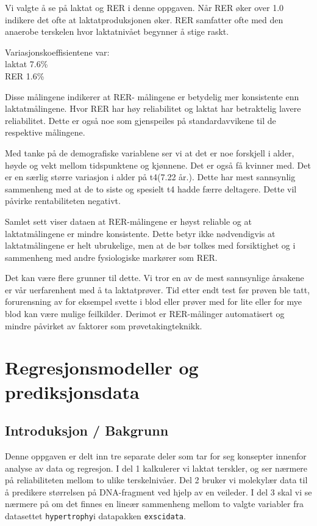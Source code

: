 \documentclass[
  letterpaper,
  DIV=11,
  numbers=noendperiod]{scrreprt}
\begin{document}
Vi valgte å se på laktat og RER i denne oppgaven. Når RER øker over 1.0
indikere det ofte at laktatproduksjonen øker. RER samfatter ofte med den
anaerobe terskelen hvor laktatnivået begynner å stige raskt.

Variasjonskoeffisientene var:\\
laktat 7.6\%\\
RER 1.6\%

Disse målingene indikerer at RER- målingene er betydelig mer konsistente
enn laktatmålingene. Hvor RER har høy reliabilitet og laktat har
betraktelig lavere reliabilitet. Dette er også noe som gjenspeiles på
standardavvikene til de respektive målingene.

Med tanke på de demografiske variablene ser vi at det er noe forskjell i
alder, høyde og vekt mellom tidspunktene og kjønnene. Det er også få
kvinner med. Det er en særlig større variasjon i alder på t4(7.22 år.).
Dette har mest sannsynlig sammenheng med at de to siste og spesielt t4
hadde færre deltagere. Dette vil påvirke rentabiliteten negativt.

Samlet sett viser dataen at RER-målingene er høyst reliable og at
laktatmålingene er mindre konsistente. Dette betyr ikke nødvendigvis at
laktatmålingene er helt ubrukelige, men at de bør tolkes med
forsiktighet og i sammenheng med andre fysiologiske markører som RER.

Det kan være flere grunner til dette. Vi tror en av de mest sannsynlige
årsakene er vår uerfarenhent med å ta laktatprøver. Tid etter endt test
før prøven ble tatt, forurensning av for eksempel svette i blod eller
prøver med for lite eller for mye blod kan være mulige feilkilder.
Derimot er RER-målinger automatisert og mindre påvirket av faktorer som
prøvetakingteknikk.


\chapter{Regresjonsmodeller og
prediksjonsdata}\label{regresjonsmodeller-og-prediksjonsdata}

\section{Introduksjon / Bakgrunn}\label{introduksjon-bakgrunn}

Denne oppgaven er delt inn tre separate deler som tar for seg konsepter
innenfor analyse av data og regresjon. I del 1 kalkulerer vi laktat
terskler, og ser nærmere på reliabiliteten mellom to ulike
terskelnivåer. Del 2 bruker vi molekylær data til å predikere størrelsen
på DNA-fragment ved hjelp av en veileder. I del 3 skal vi se nærmere på
om det finnes en lineær sammenheng mellom to valgte variabler fra
datasettet \texttt{hypertrophy}i datapakken \texttt{exscidata}.
\end{document}
